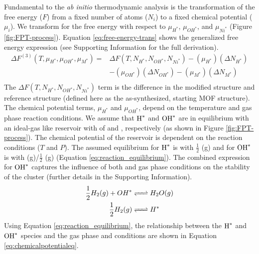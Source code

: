 \documentclass[journal=jctcce,manuscript=article]{achemso}
\begin{document}
Fundamental to the \textit{ab initio} thermodynamic analysis is the transformation of the free energy ($F$) from a fixed number of atoms ($N_i$) to a fixed chemical potential ($\mu_i$). We transform for the free energy with respect to $\mu_{H^{*}}$, $\mu_{OH^{*}}$, and $\mu_{Ni^{*}}$ (Figure \ref{fig:FPT-process}). Equation \ref{eq:free-energy-trans} shows the generalized free energy expression (see Supporting Information for the full derivation).
\begin{equation}
    \begin{split}
        \Delta F^{(3)}(T,\mu_{H^{*}},\mu_{OH^{*}},\mu_{M^{*}})  = & \Delta F(T,N_{H^{*}},N_{OH^{*}},N_{Ni^{*}}) - (\mu_{H^{*}})(\Delta N_{H^{*}}) \\
        & - (\mu_{OH^{*}})(\Delta N_{OH^{*}}) 
          - (\mu_{M^{*}})(\Delta N_{M^{*}}) \\ 
    \end{split}
    \label{eq:free-energy-trans}
\end{equation}
The $\Delta F(T,N_{H^{*}},N_{OH^{*}},N_{Ni^{*}})$ term is the difference in the modified structure and reference structure (defined here as the as-synthesized, starting MOF structure). The chemical potential terms,  $\mu_{H^{*}}$ and $\mu_{OH^{*}}$, depend on the temperature and gas phase reaction conditions. We assume that $\ce{H^{*}}$ and $\ce{OH^{*}}$ are in equilibrium with an ideal-gas like reservoir with of  and , respectively (as shown in Figure \ref{fig:FPT-process}). The chemical potential of the reservoir is dependent on the reaction conditions ($T$ and $P$).  The assumed equilibrium for $\ce{H^{*}}$ is with $\frac{1}{2}$  (g) and for $\ce{OH^{*}}$ is with  (g)/$\frac{1}{2}$ (g) (Equation \ref{eq:reaction_equilibrium}). The combined expression for $\ce{OH^{*}}$ captures the influence of both  and  gas phase conditions on the stability of the cluster (further details in the Supporting Information).
\begin{equation}
    \begin{split}
        \frac{1}{2} H_{2} (g) + OH^{*} & \ce{<=>} H_{2}O (g) \\ 
        \frac{1}{2} H_{2} (g) & \ce{<=>} H^{*}            
    \end{split}
    \label{eq:reaction_equilibrium}
\end{equation}
Using Equation \ref{eq:reaction_equilibrium}, the relationship between the $\ce{H^{*}}$ and $\ce{OH^{*}}$ species and the gas phase  and  conditions are shown in Equation \ref{eq:chemicalpotentialeq}. 
\end{document}
